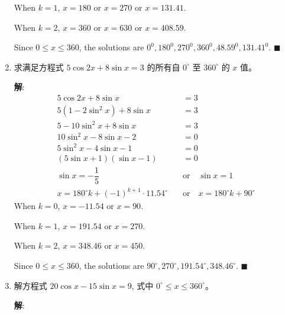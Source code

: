 \documentclass{report}
\newcommand{\sol}{\vspace{0.2cm}\textbf{解}:}
\begin{document}
\begin{enumerate}[leftmargin=*]
        When $k = 1$, $x = 180$ or $x = 270$ or $x = 131.41$.

        When $k = 2$, $x = 360$ or $x = 630$ or $x = 408.59$.

        Since $0 \leq x \leq 360$, the solutions are $0^{0}, 180^{0}, 270^{0}, 360^{0}, 48.59^{0}, 131.41^{0}$. \hfill $\blacksquare$

        
        \item 求满足方程式 $5 \cos 2 x+8 \sin x=3$ 的所有自 $0^{\circ}$ 至 $360^{\circ}$ 的 $x$ 值。
        
        \sol{}
        \begin{align*}
            5 \cos 2 x + 8 \sin x &= 3\\
            5 (1 - 2\sin^2 x) + 8 \sin x &= 3\\
            5 - 10\sin^2 x + 8\sin x &= 3\\
            10\sin^2 x - 8\sin x - 2 &= 0\\
            5\sin^2 x - 4\sin x - 1 &= 0\\
            (5\sin x + 1)(\sin x - 1) &= 0\\
            \sin x = -\dfrac{1}{5} \quad &\text{or} \quad \sin x = 1\\
            x = 180^{\circ}k + (-1)^{k+1} \cdot 11.54^{\circ} \quad &\text{or} \quad x = 180^{\circ}k + 90^{\circ}
        \end{align*}
        When $k = 0$, $x = -11.54$ or $x = 90$.

        When $k = 1$, $x = 191.54$ or $x = 270$.

        When $k = 2$, $x = 348.46$ or $x = 450$.

        Since $0 \leq x \leq 360$, the solutions are $90^{\circ}, 270^{\circ}, 191.54^{\circ}, 348.46^{\circ}$. \hfill $\blacksquare$
        
        \item 解方程式 $20 \cos x-15 \sin x=9$, 式中 $0^{\circ} \leq x \leq 360^{\circ}$。
        
        \sol{}


\end{enumerate}
\end{document}
